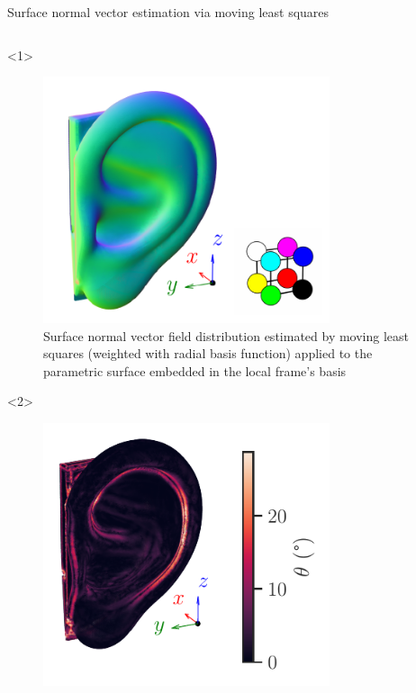 \documentclass[xcolor=dvipsnames,10pt]{beamer}
\begin{document}
\begin{frame}{Surface normal vector estimation via moving least squares}
    \begin{columns}[c]
        \begin{column}{0.5\textwidth}
            \begin{onlyenv}<1>
                \begin{center}
                \begin{figure}
                    \includegraphics[width=0.75\textwidth]{artwork/ear_surf_n.pca.pdf}
                    \caption{Surface normal vector field distribution estimated by moving least squares (weighted with radial basis function) applied to the parametric surface embedded in the local frame's basis}
                \end{figure}
                \end{center}
            \end{onlyenv}
            \begin{onlyenv}<2>
                \begin{center}
                \begin{figure}
                    \includegraphics[width=0.75\textwidth]{artwork/ear_error_dist.pdf}

\end{figure}
\end{center}
\end{onlyenv}
\end{column}
\end{columns}
\end{frame}
\end{document}
